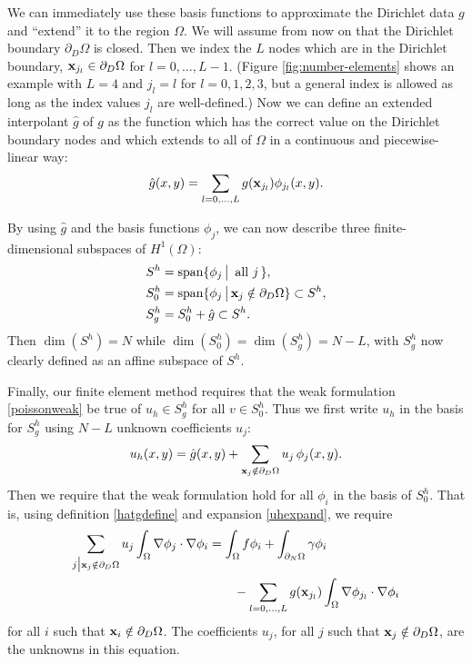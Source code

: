 We can immediately use these basis functions to approximate the Dirichlet data $g$ and ``extend'' it to the region $\Omega$.  We will assume from now on that the Dirichlet boundary $\partial_D\Omega$ is closed.  Then we index the $L$ nodes which are in the Dirichlet boundary, $\mathbf{x}_{j_l} \in \partial_D\Omega$ for $l=0,\dots,L-1$.  (Figure \ref{fig:number-elements} shows an example with $L=4$ and $j_l=l$ for $l=0,1,2,3$, but a general index is allowed as long as the index values $j_l$ are well-defined.)  Now we can define an extended interpolant $\hat g$ of $g$ as the function which has the correct value on the Dirichlet boundary nodes and which extends to all of $\Omega$ in a continuous and piecewise-linear way:
\begin{equation}
\hat g(x,y) = \sum_{l=0,\dots,L} g(\mathbf{x}_{j_l}) \phi_{j_l}(x,y). \label{hatgdefine}
\end{equation}

By using $\hat g$ and the basis functions $\phi_j$, we can now describe three finite-dimensional subspaces of $H^1(\Omega)$:
\begin{align*}
S^h &= \operatorname{span}\{\phi_j \,\big|\, \text{ all } j\,\}, \\
S_0^h &= \operatorname{span}\{\phi_j \,\big|\, \mathbf{x}_j \notin \partial_D \Omega\} \subset S^h, \\
S_g^h &= S_0^h + \hat g \subset S^h.
\end{align*}
Then $\dim(S^h)=N$ while $\dim(S_0^h)=\dim(S_g^h)=N-L$, with $S_g^h$ now clearly defined as an affine subspace of $S^h$.

Finally, our finite element method requires that the weak formulation  \eqref{poissonweak} be true of $u_h\in S_g^h$ for all $v\in S_0^h$.  Thus we first write $u_h$ in the basis for $S_g^h$ using $N-L$ unknown coefficients $u_j$:
\begin{equation}
u_h(x,y) = \hat g(x,y) + \sum_{\mathbf{x}_j \notin \partial_D \Omega} u_j\, \phi_j(x,y). \label{uhexpand}
\end{equation}
Then we require that the weak formulation hold for all $\phi_i$ in the basis of $S_0^h$.  That is, using definition \eqref{hatgdefine} and expansion \eqref{uhexpand}, we require
\begin{align}
\sum_{j\big|\mathbf{x}_j \notin \partial_D \Omega} u_j \int_\Omega \nabla \phi_j \cdot \nabla \phi_i &= \int_\Omega f \phi_i + \int_{\partial_N\Omega} \gamma \phi_i \label{poissonfem} \\
&\qquad - \sum_{l=0,\dots,L} g(\mathbf{x}_{j_l})  \int_\Omega \nabla \phi_{j_l} \cdot \nabla \phi_i \notag
\end{align}
for all $i$ such that $\mathbf{x}_i \notin \partial_D \Omega$.  The coefficients $u_j$, for all $j$ such that $\mathbf{x}_j \notin \partial_D \Omega$, are the unknowns in this equation.

